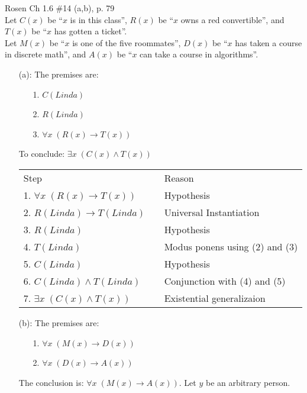 \begin{questions}
 Rosen Ch 1.6 \#14 (a,b), p. 79 \\
Let $C(x)$ be ``$x$ is in this class'', $R(x)$ be ``$x$ owns a red convertible'', and $T(x)$ be ``$x$ has gotten a ticket''. \\
Let $M(x)$ be ``$x$ is one of the five roommates'', $D(x)$ be ``$x$ has taken a course in discrete math'', and $A(x)$ be ``$x$ can take a course in algorithms''.
    \ifprintanswers
        \vspace{-15pt}
    \fi
  \begin{solution}
    \begin{itemize}[itemsep=0pt,parsep=0pt,topsep=0pt,partopsep=0pt]
    \item[(a):] The premises are:
    \begin{itemize}[itemsep=0pt,parsep=0pt,topsep=0pt,partopsep=0pt]
        \item[1.] $C(Linda)$
        \item[2.] $R(Linda)$
        \item[3.] $\forall x\; (R(x) \rightarrow T(x))$
    \end{itemize}
    To conclude: $\exists x\; (C(x) \wedge T(x))$

    \smallskip
    \begin{tabular}{lll}
        Step        & \hspace{0.2in} & Reason \\
        1. $\forall x\; (R(x) \rightarrow T(x))$    &   & Hypothesis \\
        2. $R(Linda) \rightarrow T(Linda)$          &   & Universal Instantiation \\
        3. $R(Linda)$                               &   & Hypothesis \\
        4. $T(Linda)$                               &   & Modus ponens using (2) and (3) \\
        5. $C(Linda)$                               &   & Hypothesis \\
        6. $C(Linda) \wedge T(Linda)$               &   & Conjunction with (4) and (5) \\
        7. $\exists x\; (C(x) \wedge T(x))$         &   & Existential generalizaion \\
    \end{tabular}

    \item[(b):] The premises are:
    \begin{itemize}[itemsep=0pt,parsep=0pt,topsep=0pt,partopsep=0pt]
        \item[1.] $\forall x\;(M(x) \rightarrow D(x))$
        \item[2.] $\forall x\;(D(x) \rightarrow A(x))$
    \end{itemize}
    The conclusion is: $\forall x\;(M(x) \rightarrow A(x))$.  Let $y$ be an arbitrary person.


\end{itemize}
\end{solution}
\end{questions}
